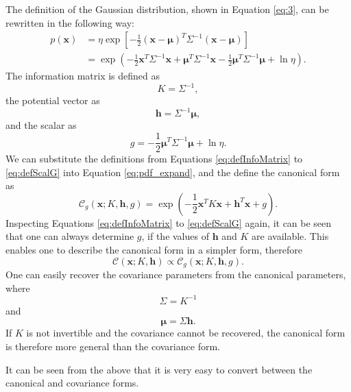 \documentclass[12pt,oneside,openany,a4paper, %
afrikaans,english,
]{memoir}
\numberwithin{equation}{chapter}
\begin{document}
{The definition of the Gaussian distribution, shown in Equation \ref{eq:3}, can be rewritten in the following way:
\begin{equation}
\begin{split}\label{eq:pdf_expand}
p(\bm{x}) & = \eta\exp\left[-\frac{1}{2}(\bm{x}-\bm{\mu})^T\Sigma^{-1}(\bm{x}-\bm{\mu})\right]\\
& = \exp\left(-\frac{1}{2}\bm{x}^T\Sigma^{-1}\bm{x} + \bm{\mu}^T\Sigma^{-1}\bm{x} - \frac{1}{2}\bm{\mu}^T\Sigma^{-1}\bm{\mu} + \ln{\eta}\right).
\end{split}
\end{equation}
The information matrix is defined as
\begin{equation}\label{eq:defInfoMatrix}
K = \Sigma^{-1},
\end{equation}
the potential vector as
\begin{equation}\label{eq:defPotVec}
\bm{h} = \Sigma^{-1}\bm{\mu},
\end{equation}
and the scalar as
\begin{equation}\label{eq:defScalG}
g = - \frac{1}{2}\bm{\mu}^T\Sigma^{-1}\bm{\mu} + \ln{\eta}.
\end{equation}
We can substitute the definitions from Equations \ref{eq:defInfoMatrix} to \ref{eq:defScalG} into Equation \ref{eq:pdf_expand}, and the define the canonical form as
\begin{equation}\label{eq:defCanonical}
\mathcal{C}_g(\bm{x}; K,\bm{h},g) = \exp\left(-\frac{1}{2}\bm{x}^TK\bm{x} + \bm{h}^T\bm{x} +g \right).
\end{equation}
Inspecting Equations \ref{eq:defInfoMatrix} to \ref{eq:defScalG} again, it can be seen that one can always determine $g$, if the values of $\bm{h}$ and $K$ are available. This enables one to describe the canonical form in a simpler form, therefore
\begin{equation}
\mathcal{C}(\bm{x}; K,\bm{h}) \propto \mathcal{C}_g(\bm{x}; K,\bm{h},g).
\end{equation}
One can easily recover the covariance parameters from the canonical parameters, where
\begin{equation}
\Sigma = K^{-1}
\end{equation}
and
\begin{equation}
\bm{\mu} = \Sigma\bm{h}.
\end{equation}
If $K$ is not invertible and the covariance cannot be recovered, the canonical form is therefore more general than the covariance form.

It can be seen from the above that it is very easy to convert between the canonical and covariance forms. 
}
\end{document}
